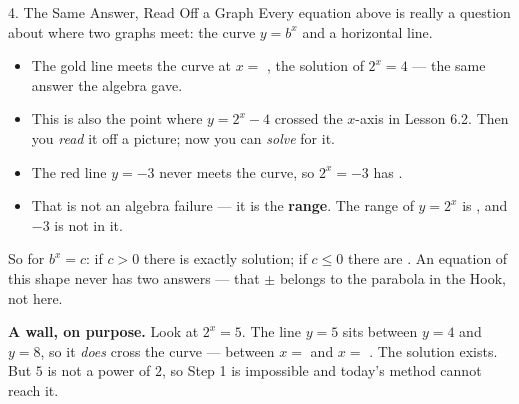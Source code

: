 \documentclass[10pt]{article}
\newcommand{\lgrid}[4]{%
  \draw[step=1, linegray!40, very thin] (#1,#3) grid (#2,#4);
  \draw[->, semithick, charcoal] (#1,0)--(#2,0) node[below right, font=\scriptsize]{$x$};
  \draw[->, semithick, charcoal] (0,#3)--(0,#4) node[left, font=\scriptsize]{$y$};}
\newcommand{\expgraph}[6]{\draw[very thick, forest, domain=#5:#6, samples=140, smooth]
  plot (\x,{(#1)*exp((#2)*((\x)-(#3)))+(#4)});}
\newcommand{\solline}[3]{\draw[goldacc, very thick] (#1,#3)--(#2,#3);}
\begin{document}
\begin{notesbox}{4. The Same Answer, Read Off a Graph}
Every equation above is really a question about where two graphs meet: the curve $y=b^{x}$ and a
horizontal line.
\begin{center}
\begin{minipage}[c]{0.42\linewidth}
\centering
{}
\end{minipage}
\begin{minipage}[c]{0.54\linewidth}
\small
\begin{itemize}[leftmargin=1.3em, itemsep=4pt]
  \item The gold line meets the curve at $x=$ \blank{1.2cm}, the solution of $2^{x}=4$ --- the same
        answer the algebra gave.
  \item This is also the point where $y=2^{x}-4$ crossed the $x$-axis in Lesson 6.2. Then you
        \emph{read} it off a picture; now you can \emph{solve} for it.
  \item The red line $y=-3$ never meets the curve, so $2^{x}=-3$ has \blank{2.6cm}.
  \item That is not an algebra failure --- it is the \textbf{range}. The range of $y=2^{x}$ is
        \blank{2.2cm}, and $-3$ is not in it.
\end{itemize}
\end{minipage}
\end{center}

\vspace{3pt}
So for $b^{x}=c$: if $c>0$ there is exactly \blank{1.6cm} solution; if $c\le0$ there are
\blank{1.6cm}. An equation of this shape never has two answers --- that $\pm$ belongs to the parabola
in the Hook, not here.

\vspace{5pt}
\begin{tcolorbox}[colback=sky, colframe=navy, boxrule=0.8pt, arc=1.5mm,
    left=2.5mm, right=2.5mm, top=1.5mm, bottom=1.5mm]
\textbf{A wall, on purpose.} Look at $2^{x}=5$. The line $y=5$ sits between $y=4$ and $y=8$, so it
\emph{does} cross the curve --- between $x=$ \blank{1.0cm} and $x=$ \blank{1.0cm}. The solution
exists. But $5$ is not a power of $2$, so Step 1 is impossible and today's method cannot reach it.


\end{tcolorbox}
\end{notesbox}
\end{document}
